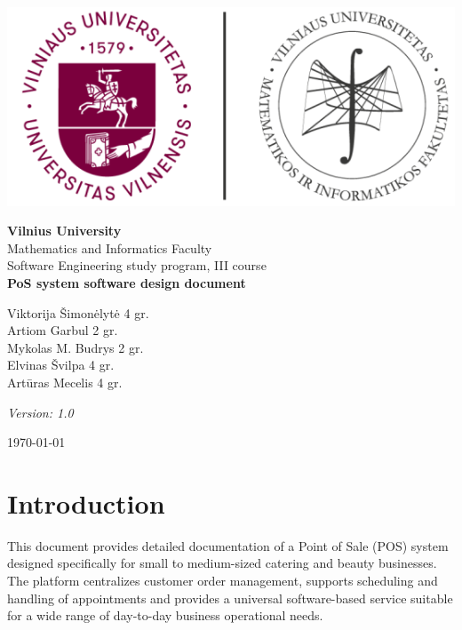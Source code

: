 \documentclass[11pt,a4paper,pdftex]{article}
\begin{document}
\begin{titlepage}
    \centering
    \vspace*{2cm}
    \includegraphics[scale=0.7]{graphics/vu mif.png}

    
    {\Large \textbf{Vilnius University}}\\[0.5cm]
    {\large Mathematics and Informatics Faculty}\\[0.3cm]
    {\large Software Engineering study program, III course}\\[3cm]
    
    {\Huge \textbf{PoS system software design document}}\\[3cm]
    
    \begin{flushleft}
    Viktorija Šimonėlytė 4 gr. \\
    Artiom Garbul 2 gr. \\
    Mykolas M. Budrys 2 gr. \\
    Elvinas Švilpa 4 gr. \\
    Artūras Mecelis 4 gr. \\
    \end{flushleft}
    
    \vfill

    \textit{Version: 1.0}

    \vspace{1em}
    
    {\large \today}
\end{titlepage}

\tableofcontents
\newpage

\section{Introduction}

This document provides detailed documentation of a Point of Sale (POS) system designed specifically for small to medium-sized catering and beauty businesses. The platform centralizes customer order management, supports scheduling and handling of appointments and provides a universal software-based service suitable for a wide range of day-to-day business operational needs.
\end{document}
